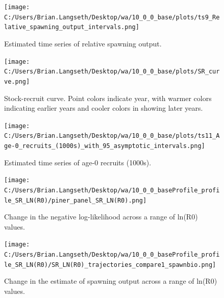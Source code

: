 \documentclass[11pt,
  english,
  letterpaper,
]{article}
\begin{document}
\tagmcend\tagstructend


\begin{figure}
\centering
\texttt{[image: C:/Users/Brian.Langseth/Desktop/wa/10\_0\_0\_base/plots/ts9\_Relative\_spawning\_output\_intervals.png]}
\caption{Estimated time series of relative spawning output.\label{fig:depl}}
\end{figure}

\tagmcend\tagstructend


\begin{figure}
\centering
\texttt{[image: C:/Users/Brian.Langseth/Desktop/wa/10\_0\_0\_base/plots/SR\_curve.png]}
\caption{Stock-recruit curve. Point colors indicate year, with warmer colors indicating earlier years and cooler colors in showing later years.\label{fig:bh-curve}}
\end{figure}

\tagmcend\tagstructend


\begin{figure}
\centering
\texttt{[image: C:/Users/Brian.Langseth/Desktop/wa/10\_0\_0\_base/plots/ts11\_Age-0\_recruits\_(1000s)\_with\_95\_asymptotic\_intervals.png]}
\caption{Estimated time series of age-0 recruits (1000s).\label{fig:recruits}}
\end{figure}

\tagmcend\tagstructend


\begin{figure}
\centering
\texttt{[image: C:/Users/Brian.Langseth/Desktop/wa/10\_0\_0\_baseProfile\_profile\_SR\_LN(R0)/piner\_panel\_SR\_LN(R0).png]}
\caption{Change in the negative log-likelihood across a range of ln(R0) values.\label{fig:r0-profile}}
\end{figure}

\tagmcend\tagstructend


\begin{figure}
\centering
\texttt{[image: C:/Users/Brian.Langseth/Desktop/wa/10\_0\_0\_baseProfile\_profile\_SR\_LN(R0)/SR\_LN(R0)\_trajectories\_compare1\_spawnbio.png]}
\caption{Change in the estimate of spawning output across a range of ln(R0) values.\label{fig:r0-ssb}}
\end{figure}
\end{document}
